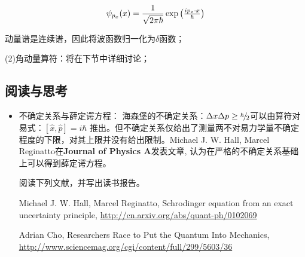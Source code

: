 \begin{equation}\label{13-1}
\psi _{p_x } (x) = \frac{1}{{\sqrt {2\pi \hbar } }}\exp \left( {{\textstyle{{ip_x  \cdot x} \over \hbar }}} \right)
\end{equation}

动量谱是连续谱，因此将波函数归一化为$\delta$函数；


(2)角动量算符：将在下节中详细讨论；


\subsection*{阅读与思考}


\begin{itemize}

    \item 不确定关系与薛定谔方程：
海森堡的不确定关系：$\Delta x\Delta p \ge
{\raise0.5ex\hbox{$\scriptstyle \hbar $} \kern-0.1em/\kern-0.15em
\lower0.25ex\hbox{$\scriptstyle 2$}}$可以由算符对易式：$ \left[
{\hat{x},\hat{p}} \right] = i\hbar$
推出。但不确定关系仅给出了测量两不对易力学量不确定程度的下限，对其上限并没有给出限制。Michael
J. W. Hall, Marcel Reginatto在\textbf{Journal of Physics A}发表文章,
认为在严格的不确定关系基础上可以得到薛定谔方程。

阅读下列文献，并写出读书报告。


Michael J. W. Hall, Marcel Reginatto, Schrodinger equation from an
exact uncertainty principle,
\url{http://cn.arxiv.org/abs/quant-ph/0102069}


Adrian Cho, Researchers Race to Put the Quantum Into Mechanics,
\url{http://www.sciencemag.org/cgi/content/full/299/5603/36}


   \end{itemize}
